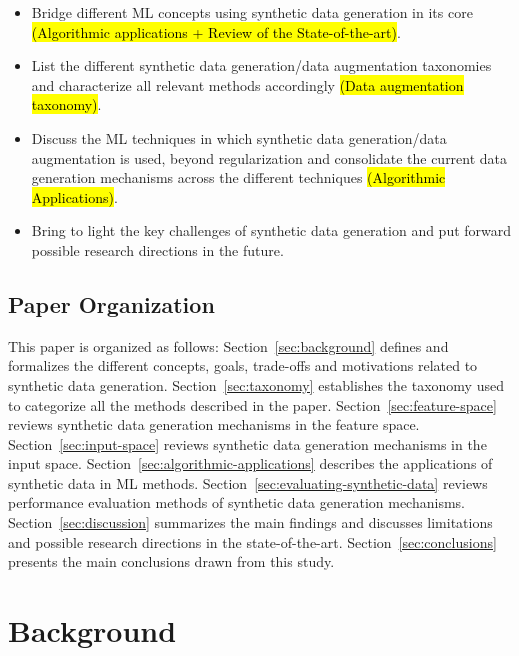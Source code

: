 \documentclass[parskip=full]{scrartcl}
\begin{document}
\begin{itemize}
    \item Bridge different ML concepts using synthetic data generation in its
        core \hl{(Algorithmic applications + Review of the State-of-the-art)}.
    \item List the different synthetic data generation/data augmentation
        taxonomies and characterize all relevant methods accordingly \hl{(Data
        augmentation taxonomy)}.
    \item Discuss the ML techniques in which synthetic data generation/data
        augmentation is used, beyond regularization and consolidate the
        current data generation mechanisms across the different techniques
        \hl{(Algorithmic Applications)}.
    \item Bring to light the key challenges of synthetic data generation and
        put forward possible research directions in the future.
\end{itemize}



\subsection{Paper Organization}

This paper is organized as follows: Section~\ref{sec:background} defines and
formalizes the different concepts, goals, trade-offs and motivations related
to synthetic data generation. Section~\ref{sec:taxonomy} establishes the
taxonomy used to categorize all the methods described in the paper.
Section~\ref{sec:feature-space} reviews synthetic data generation
mechanisms in the feature space. Section~\ref{sec:input-space}
reviews synthetic data generation mechanisms in the input space.
Section~\ref{sec:algorithmic-applications} describes the applications of
synthetic data in ML methods. Section~\ref{sec:evaluating-synthetic-data}
reviews performance evaluation methods of synthetic data generation
mechanisms. Section~\ref{sec:discussion} summarizes the main findings and
discusses limitations and possible research directions in the
state-of-the-art. Section~\ref{sec:conclusions} presents the main conclusions
drawn from this study.

\section{Background}~\label{sec:background}

\end{document}
